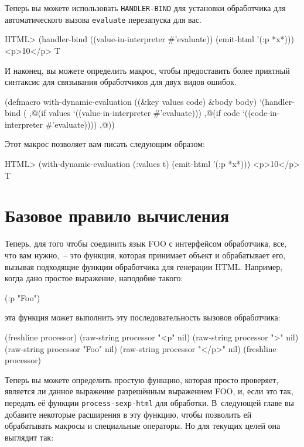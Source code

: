 Теперь вы можете использовать \lstinline{HANDLER-BIND} для установки обработчика для
автоматического вызова \lstinline{evaluate} перезапуска для вас.

\begin{myverb}
HTML> (handler-bind ((value-in-interpreter \#{}'evaluate)) (emit-html '(:p *x*)))
<p>10</p>
T
\end{myverb}

И наконец, вы можете определить макрос, чтобы предоставить более приятный синтаксис для
связывания обработчиков для двух видов ошибок.

\begin{myverb}
(defmacro with-dynamic-evaluation ((\&{}key values code) \&{}body body)
  `(handler-bind (
       ,@(if values `((value-in-interpreter \#{}'evaluate)))
       ,@(if code `((code-in-interpreter \#'evaluate))))
     ,@))
\end{myverb}

Этот макрос позволяет вам писать следующим образом: 

\begin{myverb}
HTML> (with-dynamic-evaluation (:values t) (emit-html '(:p *x*)))
<p>10</p>
T
\end{myverb}

\normalsize

\section{Базовое правило вычисления}

Теперь, для того чтобы соединить язык FOO с интерфейсом обработчика, все, что вам
нужно,~-- это функция, которая принимает объект и обрабатывает его, вызывая подходящие
функции обработчика для генерации HTML. Например, когда дано простое выражение, наподобие
такого:

\begin{myverb}
(:p "Foo")
\end{myverb}

\noindent{}эта функция может выполнить эту последовательность вызовов обработчика:

\begin{myverb}
(freshline processor)
(raw-string processor "<p" nil)
(raw-string processor ">" nil)
(raw-string processor "Foo" nil)
(raw-string processor "</p>" nil)
(freshline processor)
\end{myverb}

Теперь вы можете определить простую функцию, которая просто проверяет, является ли данное
выражение разрешённым выражением FOO, и, если это так, передать её функции
\lstinline{process-sexp-html} для обработки. В~следующей главе вы добавите некоторые расширения
в эту функцию, чтобы позволить ей обрабатывать макросы и специальные операторы. Но для
текущих целей она выглядит так:

